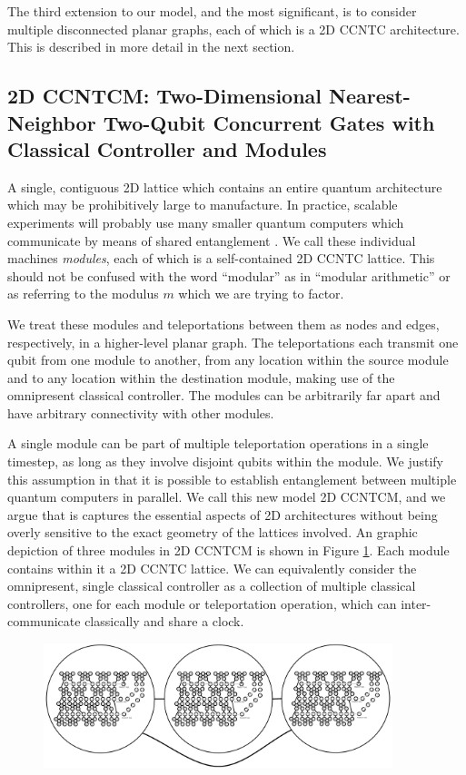 \documentclass[twoside]{article}
\begin{document}
The third extension to our model, and the most significant, is to consider
multiple disconnected planar graphs, each of which is a 2D CCNTC
architecture. This is described in more detail in the next section.

\subsection{\textsc{2D CCNTCM}: Two-Dimensional Nearest-Neighbor Two-Qubit Concurrent Gates with Classical Controller and Modules}
\label{subsec:2dccntcm}

A single, contiguous
2D lattice which contains an entire quantum architecture which may be prohibitively large to manufacture. In practice,
scalable experiments will probably use many
smaller quantum computers which communicate by means of shared
entanglement \cite{Monroe2012}.
We call these individual machines \emph{modules}, each of
which is a self-contained \textsc{2D CCNTC} lattice. This should not be
confused with the word ``modular'' as in ``modular arithmetic'' or as
referring to the modulus $m$ which we are trying to factor.

We treat these modules
and teleportations between them as nodes and edges, respectively,
in a higher-level planar graph. The teleportations each transmit one qubit
from one module to another, from any location within the source module and
to any location within the destination module, making use of the
omnipresent classical controller. The modules can be arbitrarily far
apart and have arbitrary
connectivity with other modules.

A single module can be part of multiple teleportation operations in a single timestep, as long as they involve disjoint qubits within the module.
We justify this assumption in that it is
possible to establish entanglement between multiple
quantum computers
in parallel. We call this new model \textsc{2D CCNTCM},
and we argue that is captures the essential aspects of 2D architectures
without being overly sensitive to the exact geometry of the lattices involved.
An graphic depiction of three modules in \textsc{2D CCNTCM} is shown in
Figure \ref{fig:modules}. Each module contains within it a
\textsc{2D CCNTC} lattice. We can equivalently consider the omnipresent,
single
classical controller as a collection of multiple classical controllers, one
for each module or teleportation operation, which can inter-communicate
classically and share a clock.

\begin{figure}[btp!]
\begin{center}
\includegraphics[width=4in]{./modules.pdf}
\end{center}
\label{fig:modules}
\end{figure}
\end{document}
